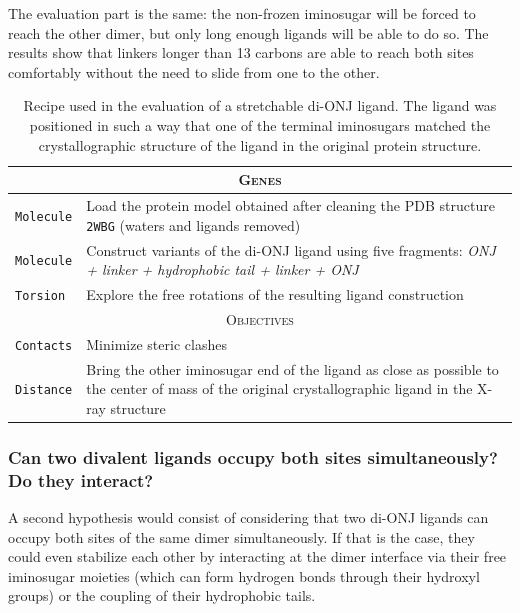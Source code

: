 The evaluation part is the same: the non-frozen iminosugar will be forced to reach the other dimer, but only long enough ligands will be able to do so. The results show that linkers longer than 13 carbons are able to reach both sites comfortably without the need to slide from one to the other.


\begin{table}[hbtp]
	\caption[Stretchable di-ONJ recipe]{Recipe used in the evaluation of a stretchable di-ONJ ligand. The ligand was positioned in such a way that one of the terminal iminosugars matched the crystallographic structure of the ligand in the original protein structure.\cite{pdb:2wbg}}
	\label{table:recipe-stretchable-divalent}
	\footnotesize
	\newcommand{\tableheading}[1]{\multicolumn{2}{c}{\textsc{#1}}}
	\begin{tabularx}{\textwidth}{RL}
		\toprule
		\tableheading{Genes}\\
		\toprule
		\texttt{Molecule} & Load the protein model obtained after cleaning the PDB structure \texttt{2WBG} (waters and ligands removed) \\
		\midrule
		\texttt{Molecule} & Construct variants of the di-ONJ ligand using five fragments: \textit{ONJ + linker + hydrophobic tail + linker + ONJ}\\
		\midrule
		\texttt{Torsion} & Explore the free rotations of the resulting ligand construction \\
		\toprule
		\tableheading{Objectives}\\
		\toprule
		\texttt{Contacts} & Minimize steric clashes \\
		\midrule
		\texttt{Distance} & Bring the other iminosugar end of the ligand as close as possible to the center of mass of the original crystallographic ligand in the X-ray structure\cite{pdb:2wbg} \\

		\bottomrule

	\end{tabularx}
\end{table}

\subsubsection[Can two divalent ligands occupy both sites simultaneously? Do they interact?]{Can two divalent ligands occupy both sites simultaneously? \\Do they interact?}
A second hypothesis would consist of considering that two di-ONJ ligands can occupy both sites of the same dimer simultaneously. If that is the case, they could even stabilize each other by interacting at the dimer interface via their free iminosugar moieties (which can form hydrogen bonds through their hydroxyl groups) or the coupling of their hydrophobic tails.

